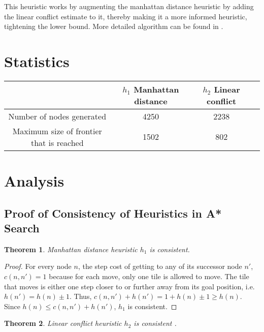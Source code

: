 \documentclass[11pt, a4paper]{article}
\newtheorem{theorem}{Theorem}
\theoremstyle{definition}
\begin{document}
This heuristic works by augmenting the manhattan distance heuristic by adding the linear conflict estimate to it, thereby making it a more informed heuristic, tightening the lower bound. More detailed algorithm can be found in .

\section{Statistics}
\begin{center}
  \begin{tabular}{ |c|c|c|c| }
    \hline
                                             & $h_1$ Manhattan distance & $h_2$ Linear conflict \\
    \hline
    Number of nodes generated                & 4250                     & 2238                  \\
    Maximum size of frontier that is reached & 1502                     & 802                   \\
    \hline
  \end{tabular}
\end{center}

\section{Analysis}
\subsection{Proof of Consistency of Heuristics in A* Search}
\begin{theorem}
  Manhattan distance heuristic $h_1$ is consistent.
\end{theorem}

\begin{proof}
  For every node $n$, the step cost of getting to any of its successor node $n'$, $c(n, n') = 1$ because for each move, only one tile is allowed to move. The tile that moves is either one step closer to or further away from its goal position, i.e. $h(n') = h(n) \pm 1$. Thus, $c(n, n') + h(n') = 1 + h(n) \pm 1 \geq h(n)$. Since $h(n) \leq c(n, n') + h(n')$, $h_1$ is consistent.
\end{proof}

\begin{theorem}
  Linear conflict heuristic $h_2$ is consistent \cite[p.~15]{hansson1985generating}.
\end{theorem}
\end{document}
